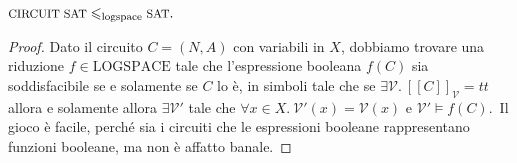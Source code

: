 \begin{property}
    $\mbox{\footnotesize CIRCUIT SAT} \leqslant_{\mathrm{logspace}} \mbox{\footnotesize SAT}.$
    \label{CircuitSatSiRiduceASAT}
\end{property}

\begin{proof}

    Dato il circuito $C = (N,A)$ con variabili in $X$, dobbiamo trovare una riduzione $f \in \mathrm{LOGSPACE}$ tale che l'espressione booleana $f(C)$ sia soddisfacibile se e solamente se $C$ lo è, in simboli tale che se $\exists \mathcal{V}.\ [\![C]\!]_\mathcal{V} = \mathit{tt}$ allora e solamente allora $\exists \mathcal{V}'$ tale che $\forall x \in X.\ \mathcal{V}'(x) = \mathcal{V}(x) $ e $\mathcal{V}' \vDash f(C)$.\
    Il gioco è facile, perché sia i circuiti che le espressioni booleane rappresentano funzioni booleane, ma non è affatto banale.


\end{proof}
